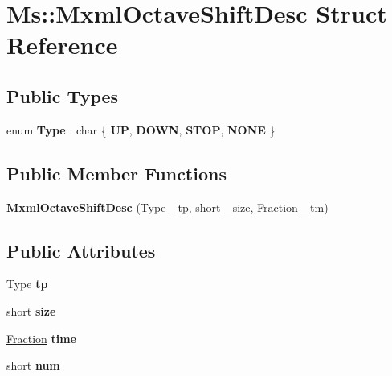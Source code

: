\hypertarget{struct_ms_1_1_mxml_octave_shift_desc}{}\section{Ms\+:\+:Mxml\+Octave\+Shift\+Desc Struct Reference}
\label{struct_ms_1_1_mxml_octave_shift_desc}
\subsection*{Public Types}
\begin{DoxyCompactItemize}
\item 
\mbox{\label{struct_ms_1_1_mxml_octave_shift_desc_a829db3f522b443cb3440a698c900f805}} 
enum {\bfseries Type} \+: char \{ {\bfseries UP}, 
{\bfseries D\+O\+WN}, 
{\bfseries S\+T\+OP}, 
{\bfseries N\+O\+NE}
 \}
\end{DoxyCompactItemize}
\subsection*{Public Member Functions}
\begin{DoxyCompactItemize}
\item 
\mbox{\label{struct_ms_1_1_mxml_octave_shift_desc_a7da4d22414bde0fa1a626a2d2a327bf3}} 
{\bfseries Mxml\+Octave\+Shift\+Desc} (Type \+\_\+tp, short \+\_\+size, \hyperlink{class_ms_1_1_fraction}{Fraction} \+\_\+tm)
\end{DoxyCompactItemize}
\subsection*{Public Attributes}
\begin{DoxyCompactItemize}
\item 
\mbox{\label{struct_ms_1_1_mxml_octave_shift_desc_a8248ab06b5ef6c3c6db69a950f8977df}} 
Type {\bfseries tp}
\item 
\mbox{\label{struct_ms_1_1_mxml_octave_shift_desc_a6ecbc69df73042370934a5102ee31cde}} 
short {\bfseries size}
\item 
\mbox{\label{struct_ms_1_1_mxml_octave_shift_desc_aa53a53627a4a4274d6ae54dad75b64a9}} 
\hyperlink{class_ms_1_1_fraction}{Fraction} {\bfseries time}
\item 
\mbox{\label{struct_ms_1_1_mxml_octave_shift_desc_aa7b952ece4331801d84e5487b53194cc}} 
short {\bfseries num}
\end{DoxyCompactItemize}



